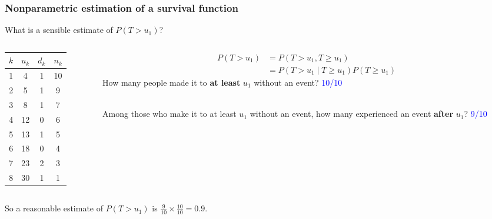 \documentclass[10pt,t]{beamer}
\begin{document}
\begin{frame}
\frametitle{Nonparametric estimation of a survival function}
What is a sensible estimate of $P(T > u_1)$?

\begin{columns}
	\begin{column}{0.3\textwidth}
		\begin{center}
\begin{tabular}{|c|c|c|c|}
	\hline
	$k$ & $u_k$ & $d_k$ & $n_k$ \\
	\hline
	1 & 4 & 1 & 10 \\
	2& 5 & 1 & 9 \\
	3& 8 & 1 & 7 \\
	4&12 & 0 & 6 \\
	5&13 & 1 & 5 \\
	6&18 & 0 & 4 \\
	7&23 & 2 & 3 \\
	8&30 & 1 & 1 \\
	\hline
\end{tabular}
	\end{center}
	\end{column}
	\begin{column}{0.7\textwidth}  %
		\begin{align*}
			P(T > u_1) &= P(T > u_1, T\geq u_1) \\
			&= P(T > u_1 \mid T \geq u_1)P(T \geq u_1)
		\end{align*}
		How many people made it to \textbf{at least} $u_1$ without an event?   \textcolor{blue}{10/10}
		\\ ~\ 
		
		Among those who make it to at least $u_1$ without an event, how many experienced an event \textbf{after} $u_1$?   \textcolor{blue}{9/10} 
	\end{column}
\end{columns}
\vspace{0.5cm}
So a reasonable estimate of $P(T > u_1)$ is $\frac{9}{10} \times \frac{10}{10} = 0.9$.
\end{frame}
\end{document}
